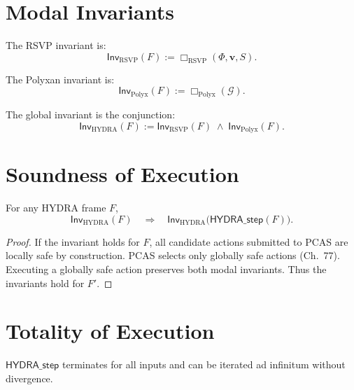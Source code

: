 \section{Modal Invariants}

\begin{definition}
The RSVP invariant is:
\[
\mathsf{Inv}_{\mathrm{RSVP}}(F)
:= \Box_{\mathrm{RSVP}}(\Phi,\mathbf{v},S).
\]
\end{definition}

\begin{definition}
The Polyxan invariant is:
\[
\mathsf{Inv}_{\mathrm{Polyx}}(F)
:= \Box_{\mathrm{Polyx}}(\mathcal{G}).
\]
\end{definition}

\begin{definition}
The global invariant is the conjunction:
\[
\mathsf{Inv}_{\mathrm{HYDRA}}(F)
  := \mathsf{Inv}_{\mathrm{RSVP}}(F)
     \;\wedge\;
     \mathsf{Inv}_{\mathrm{Polyx}}(F).
\]
\end{definition}

\section{Soundness of Execution}

\begin{theorem}
\label{thm:hydra_soundness}
For any HYDRA frame $F$,
\[
\mathsf{Inv}_{\mathrm{HYDRA}}(F)
\quad\Longrightarrow\quad
\mathsf{Inv}_{\mathrm{HYDRA}}
   \bigl(\mathsf{HYDRA\_step}(F)\bigr).
\]
\end{theorem}

\begin{proof}
If the invariant holds for $F$, all candidate actions submitted to PCAS
are locally safe by construction.
PCAS selects only globally safe actions (Ch.~77).  
Executing a globally safe action preserves both modal invariants.
Thus the invariants hold for $F'$.
\end{proof}

\section{Totality of Execution}

\begin{theorem}
\label{thm:hydra_totality}
$\mathsf{HYDRA\_step}$ terminates for all inputs and
can be iterated ad infinitum without divergence.
\end{theorem}

